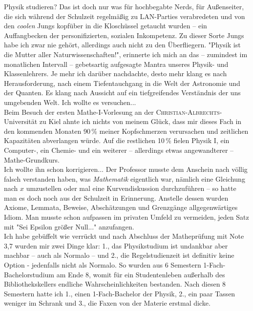 \begin{multicols}{2}
Physik studieren? Das ist doch nur was für hochbegabte Nerds, für Außenseiter, die sich während der Schulzeit regelmäßig zu LAN-Parties verabredeten und 
von den \textit{coolen} Jungs kopfüber in die Kloschüssel getaucht wurden -- ein Auffangbecken der personifizierten, sozialen Inkompetenz.
Zu dieser Sorte Jungs habe ich zwar nie gehört, allerdings auch nicht zu den Überfliegern.
"Physik ist die Mutter aller Naturwissenschaften!", erinnerte ich mich an das – zumindest im monatlichen Intervall – gebetsartig aufgesagte Mantra unseres
Physik- und Klassenlehrers. Je mehr ich darüber nachdachte, desto mehr klang es nach Herausforderung,
nach einem Tiefentauchgang in die Welt der Astronomie und der Quanten.
Es klang nach Aussicht auf ein tiefgreifendes Verständnis der uns umgebenden Welt. Ich wollte es versuchen... \\ 

Beim Besuch der ersten Mathe-\textsc{I}-Vorlesung an der \textsc{Christian-Albrechts}-Universität zu Kiel ahnte ich nichts von meinem Glück, dass mir dieses Fach in den kommenden Monaten 90\,\% meiner Kopfschmerzen
verursachen und zeitlichen Kapazitäten abverlangen würde.
Auf die restlichen 10\,\% fielen Physik \textsc{I}, ein Computer-, ein Chemie- und ein weiterer – allerdings etwas angewandterer – Mathe-Grundkurs. \\ 

Ich wollte ihn schon korrigieren... Der Professor musste dem Anschein nach völlig falsch verstanden haben, was \textit{Mathematik} eigentlich war,
nämlich eine Gleichung nach $x$ umzustellen oder mal eine Kurvendiskussion durchzuführen – so hatte man es doch noch aus der Schulzeit in Erinnerung.
Anstelle dessen wurden Axiome, Lemmata, Beweise, Abschätzungen und Grenzgänge allgegenwärtiges Idiom.
Man musste schon aufpassen im privaten Umfeld zu vermeiden, jeden Satz mit "Sei Epsilon größer Null..." anzufangen. \\ 

Ich habe gebüffelt wie verrückt und nach Abschluss der Matheprüfung mit Note 3,7 wurden mir zwei Dinge klar: 1., das Physikstudium ist undankbar aber
machbar – auch als Normalo – und 2., die Regelstudienzeit ist definitiv keine Option - jedenfalls nicht als Normalo.
So wurden aus 6 Semestern 1-Fach-Bachelorstudium am Ende 8, womit für ein Studentenleben außerhalb des
Bibliothekskellers endliche Wahrscheinlichkeiten bestanden. Nach diesen 8 Semestern hatte ich 1., einen 1-Fach-Bachelor der Physik, 2., ein paar Tassen weniger im
Schrank und 3., die Faxen von der Materie erstmal dicke. \\ 


\end{multicols}
